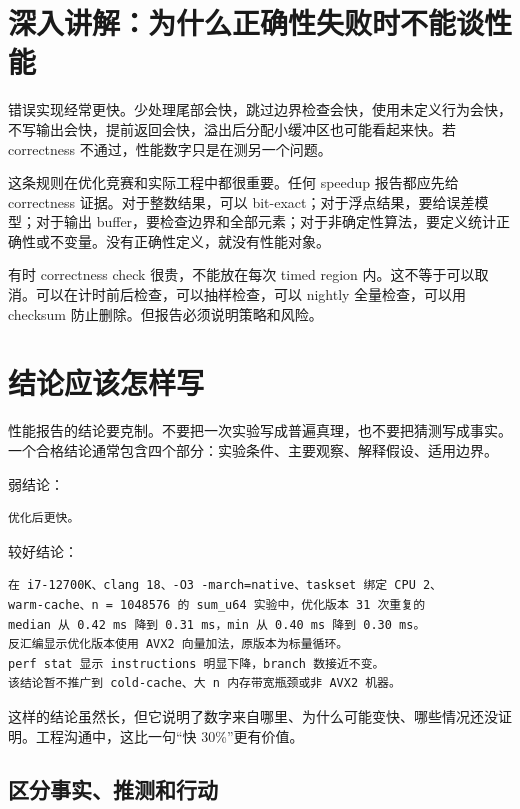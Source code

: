 \section{深入讲解：为什么正确性失败时不能谈性能}

错误实现经常更快。少处理尾部会快，跳过边界检查会快，使用未定义行为会快，不写输出会快，提前返回会快，溢出后分配小缓冲区也可能看起来快。若 correctness 不通过，性能数字只是在测另一个问题。

这条规则在优化竞赛和实际工程中都很重要。任何 speedup 报告都应先给 correctness 证据。对于整数结果，可以 bit-exact；对于浮点结果，要给误差模型；对于输出 buffer，要检查边界和全部元素；对于非确定性算法，要定义统计正确性或不变量。没有正确性定义，就没有性能对象。

有时 correctness check 很贵，不能放在每次 timed region 内。这不等于可以取消。可以在计时前后检查，可以抽样检查，可以 nightly 全量检查，可以用 checksum 防止删除。但报告必须说明策略和风险。

\section{结论应该怎样写}

性能报告的结论要克制。不要把一次实验写成普遍真理，也不要把猜测写成事实。一个合格结论通常包含四个部分：实验条件、主要观察、解释假设、适用边界。

弱结论：

\begin{lstlisting}
优化后更快。
\end{lstlisting}

较好结论：

\begin{lstlisting}
在 i7-12700K、clang 18、-O3 -march=native、taskset 绑定 CPU 2、
warm-cache、n = 1048576 的 sum_u64 实验中，优化版本 31 次重复的
median 从 0.42 ms 降到 0.31 ms，min 从 0.40 ms 降到 0.30 ms。
反汇编显示优化版本使用 AVX2 向量加法，原版本为标量循环。
perf stat 显示 instructions 明显下降，branch 数接近不变。
该结论暂不推广到 cold-cache、大 n 内存带宽瓶颈或非 AVX2 机器。
\end{lstlisting}

这样的结论虽然长，但它说明了数字来自哪里、为什么可能变快、哪些情况还没证明。工程沟通中，这比一句“快 30\%”更有价值。

\subsection{区分事实、推测和行动}

